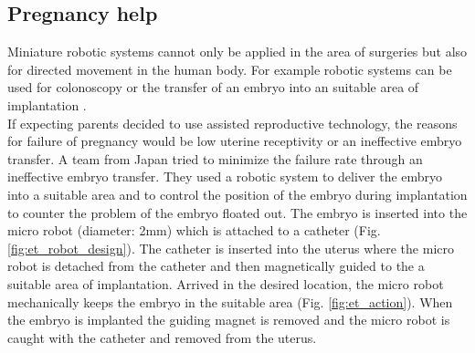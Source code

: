 \subsection{Pregnancy help}
\label{sec:birthhelp}
Miniature robotic systems cannot only be applied in the area of surgeries but also for directed movement in the human body. For example robotic systems can be used for colonoscopy \cite{colonoscopy} or the transfer of an embryo into an suitable area of implantation \cite{embryoTransfer}. \\
If expecting parents decided to use assisted reproductive technology, the reasons for failure of pregnancy would be low uterine receptivity or an ineffective embryo transfer. A team from Japan tried to minimize the failure rate through an ineffective embryo transfer. They used a robotic system to deliver the embryo into a suitable area and to control the position of the embryo during implantation to counter the problem of the embryo floated out. The embryo is inserted into the micro robot (diameter: 2mm) which is attached to a catheter (Fig. \ref{fig:et_robot_design}). The catheter is inserted into the uterus where the micro robot is detached from the catheter and then magnetically guided to the a suitable area of implantation. Arrived in the desired location, the micro robot mechanically keeps the embryo in the suitable area (Fig. \ref{fig:et_action}). When the embryo is implanted the guiding magnet is removed and the micro robot is caught with the catheter and removed from the uterus. 

